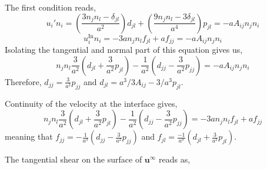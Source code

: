 The first condition reads, 
\begin{equation*}
    u_i'n_i
    =
    \left(
        \frac{3 n_j n_{l} 
        - \delta_{jl} }{a^{2}} 
    \right) d_{jl}
    + \left(\frac{9 n_j n_{l}  - 3 \delta_{jl}}{a^{4}} 
    \right)p_{jl} 
    = - a A_{ij} n_j n_i
\end{equation*}
\begin{equation*}
    u_i^\text{In} n_i
    =
    -3 a  n_j n_l f_{jl}
    + a f_{jj}
    = - a A_{ij} n_j n_i
\end{equation*}
Isolating the tangential and normal part of this equation gives us,
\begin{equation*}
    n_j n_l \frac{3}{a^2} \left( d_{jl} + \frac{3}{a^2} p_{jl}\right)
    - \frac{1}{a^2} \left(d_{jj}  - \frac{3}{a^2} p_{jj}\right)
    = - a A_{ij} n_j n_i
\end{equation*}
Therefore, $d_{jj} = \frac{3}{a^2}p_{jj}$ and $d_{jl} = a^3/3 A_{ij} - 3/a^3 p_{jl}$. 

Continuity of the velocity at the interface gives, 
\begin{equation*}
    n_j n_l \frac{3}{a^2} \left( d_{jl} + \frac{3}{a^2} p_{jl}\right)
    - \frac{1}{a^2} \left(d_{jj}  - \frac{3}{a^2} p_{jj}\right)
    = 
    -3 a  n_j n_l f_{jl}
    + a f_{jj}
\end{equation*}
meaning that $f_{jj} = - \frac{1}{a^3}  (d_{jj} - \frac{3}{a^2} p_{jj})$
and $f_{jl} = \frac{- 1}{a^3} (d_{jl} + \frac{3}{a^2} p_{jl})$.   

The tangential shear on the surface of $\textbf{u}^\infty$ reads as, 
